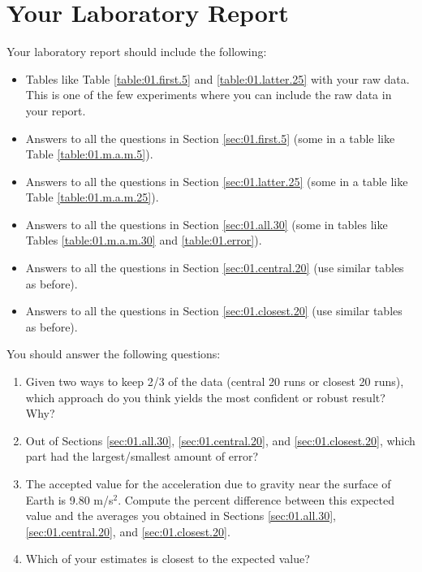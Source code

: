 \section{Your Laboratory Report}
Your laboratory report should include the following:
\begin{itemize}
    \item Tables like Table \ref{table:01.first.5} and \ref{table:01.latter.25} with your raw data. This is one of the few experiments where you can include the raw data in your report.
    \item Answers to all the questions in Section \ref{sec:01.first.5} (some in a table like Table \ref{table:01.m.a.m.5}).
    \item Answers to all the questions in Section \ref{sec:01.latter.25} (some in a table like Table \ref{table:01.m.a.m.25}).
    \item Answers to all the questions in Section \ref{sec:01.all.30} (some in tables like Tables \ref{table:01.m.a.m.30} and \ref{table:01.error}).
    \item Answers to all the questions in Section \ref{sec:01.central.20} (use similar tables as before).
    \item Answers to all the questions in Section \ref{sec:01.closest.20} (use similar tables as before).
\end{itemize}
You should answer the following questions:
\begin{enumerate}
    \item Given two ways to keep 2/3 of the data (central 20 runs or closest 20 runs), which approach do you think yields the most confident or robust result? Why?
    \item Out of Sections \ref{sec:01.all.30}, \ref{sec:01.central.20}, and \ref{sec:01.closest.20}, which part had the largest/smallest amount of error?
    \item The accepted value for the acceleration due to gravity near the surface of Earth is 9.80 m/s$^{2}$. Compute the percent difference between this expected value and the averages you obtained in Sections \ref{sec:01.all.30}, \ref{sec:01.central.20}, and \ref{sec:01.closest.20}.
    \item Which of your estimates is closest to the expected value?
\end{enumerate}
\FloatBarrier
\newpage
